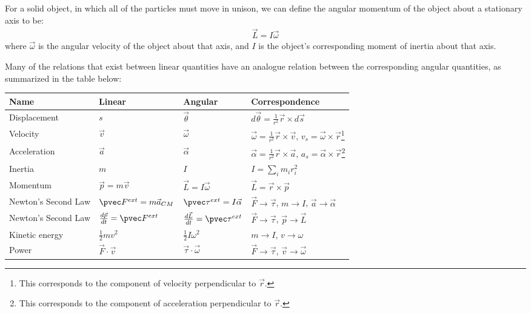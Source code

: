 \begin{chapterSummary}
For a solid object, in which all of the particles must move in unison, we can define the angular momentum of the object about a stationary axis to be:
\begin{align*}
\vec L = I\vec \omega
\end{align*}
where $\vec\omega$ is the angular velocity of the object about that axis, and $I$ is the object's corresponding moment of inertia about that axis. 

Many of the relations that exist between linear quantities have an analogue relation between the corresponding angular quantities, as summarized in the table below:

\begin{tabular}{llll}
\textbf{Name} &\textbf{Linear} & \textbf{Angular} & \textbf{Correspondence}\\
\hline\hline
Displacement & $s$ & $\vec \theta$ & $d\vec\theta=\frac{1}{r^2} \vec r\times d\vec s$  \\
Velocity & $\vec v$ & $\vec \omega$ & $\vec\omega=\frac{1}{r^2} \vec r\times \vec v$, $v_s = \vec\omega\times \vec r$\footnote{This corresponds to the component of velocity perpendicular to $\vec r$.}\\
Acceleration & $\vec a$ & $\vec \alpha$ & $\vec\alpha=\frac{1}{r^2} \vec r\times \vec a$, $a_s = \vec\alpha\times \vec r$\footnote{This corresponds to the component of acceleration perpendicular to $\vec r$.}\\
Inertia& $m$ & $I$ & $I=\sum_i m_ir_i^2$ \\
Momentum& $\vec p=m\vec v$& $\vec L = I\vec \omega$ &$\vec L = \vec r\times \vec p$ \\
Newton's Second Law&$\pvec F^{ext}=m\vec a_{CM}$ & $\pvec \tau^{ext} = I\vec\alpha$& $\vec F \to \vec\tau$, $m\to I$, $\vec a \to \vec \alpha$\\
Newton's Second Law& $\frac{d\vec p}{dt} =\pvec F^{ext}$ & $\frac{d\vec L}{dt} =\pvec \tau^{ext}$&$\vec F \to \vec\tau$, $\vec p \to \vec L$ \\
Kinetic energy&$\frac{1}{2}mv^2$ &$\frac{1}{2}I\omega^2$ &$m\to I$, $v\to \omega$ \\
Power&$\vec F \cdot \vec v$ &$\vec \tau \cdot \vec\omega$ &$\vec F \to \vec\tau$, $\vec v\to \vec\omega$  \\
\end{tabular}











\end{chapterSummary}

